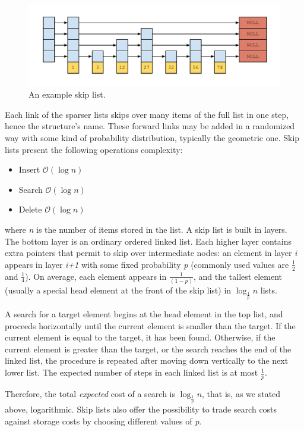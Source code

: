 \begin{figure}[htbp]
    \includegraphics[width=\columnwidth]{images/Skiplist}
    \caption{An example skip list.}
    \label{fig:skiplist}
\end{figure}

Each link of the sparser lists skips over many items of the full list in one step, hence
the structure's name. These forward links may be added in a randomized way with some
kind of probability distribution, typically the geometric one.
Skip lists present the following operations complexity:

\begin{itemize}
\item Insert $\mathcal{O}(\log{n})$
\item Search $\mathcal{O}(\log{n})$
\item Delete $\mathcal{O}(\log{n})$
\end{itemize}

\noindent where \textit{n} is the number of items stored in the list.
A skip list is built in layers.
The bottom layer is an ordinary ordered linked list. 
Each higher layer contains extra pointers that permit to skip over 
intermediate nodes: an element in layer \textit{i} appears in layer
\textit{i+1} with some fixed probability \textit{p} (commonly used values
are $\frac{1}{2}$ and $\frac{1}{4}$). On average, each element appears in
$\frac{1}{(1-p)}$, and the tallest element (usually a special head element 
at the front of the skip list) in $\log_\frac{1}{p}{n}$ lists.

A search for a target element begins at the head element in the top list,
and proceeds horizontally until the current element is smaller than the
target. If the current element is equal to the target, it has been found.
Otherwise, if the current element is greater than the target, or the search
reaches the end of the linked list, the procedure is repeated after moving 
down vertically to the next lower list. The expected number of steps in each
linked list is at most $\frac{1}{p}$.

Therefore, the total \emph{expected} cost of a search is $\log_\frac{1}{p}{n}$,
that is, as we stated above, logarithmic. Skip lists also offer the possibility
to trade search costs against storage costs by choosing different values of
\textit{p}.

